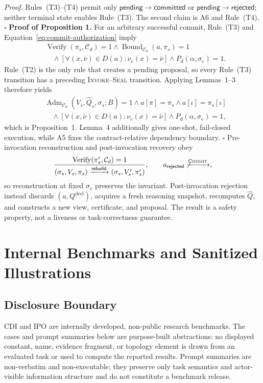 \emph{Proof.}
Rules~\textup{(T3)}--\textup{(T4)} permit only
$\mathsf{pending}\to\mathsf{committed}$ or
$\mathsf{pending}\to\mathsf{rejected}$; neither terminal state enables Rule~\textup{(T3)}. The second claim is A6 and Rule~\textup{(T4)}. \hfill$\square$
\noindent\textbf{Proof of Proposition 1.}
For an arbitrary successful commit, Rule~\textup{(T3)} and Equation~\eqref{eq:commit-authorization} imply
\begin{equation}
\begin{aligned}
&\operatorname{Verify}(\pi_s,\mathcal C_d)=1
\land\operatorname{Bound}_{\mathcal C_d}(a,\pi_s)=1\\
&\quad{}\land[\forall(x,\bar\nu)\in D(a):\nu_e(x)=\bar\nu]
\land P_d(\alpha,\sigma_e)=1.
\end{aligned}
\label{eq:prop-conjuncts}
\end{equation}
Rule~\textup{(T2)} is the only rule that creates a pending proposal, so every Rule~\textup{(T3)} transition has a preceding \textsc{Invoke--Seal} transition. Applying Lemmas~1--3 therefore yields
\begin{equation}
\begin{aligned}
&\operatorname{Adm}_{\mathcal C_d}(V_s,\widehat Q_s,\sigma_s;B)=1
\land a[\pi]=\pi_s
\land a[\iota]=\pi_s[\iota]\\
&\quad{}\land[\forall(x,\bar\nu)\in D(a):\nu_e(x)=\bar\nu]
\land P_d(\alpha,\sigma_e)=1,
\end{aligned}
\label{eq:prop-result}
\end{equation}
which is Proposition~1. Lemma~4 additionally gives one-shot, fail-closed execution, while A5 fixes the contract-relative dependency boundary. \hfill$\square$
Pre-invocation reconstruction and post-invocation recovery obey
\[
\frac{\operatorname{Verify}(\pi'_s,\mathcal C_d)=1}
{(\sigma_s,V_s,\pi_s)\xrightarrow{\mathsf{rebuild}}
(\sigma_s,V'_s,\pi'_s)},
\qquad
a_{\mathsf{rejected}}\not\xrightarrow{\textsc{Commit}},
\]
so reconstruction at fixed $\sigma_s$ preserves the invariant. Post-invocation rejection instead discards $(a,Q^{\mathrm{decl}})$, acquires a fresh reasoning snapshot, recomputes $\widehat Q$, and constructs a new view, certificate, and proposal. The result is a safety property, not a liveness or task-correctness guarantee.
\section{Internal Benchmarks and Sanitized Illustrations}
\label{app:benchmark-illustrations}
\subsection{Disclosure Boundary}
CDI and IPO are internally developed, non-public research benchmarks. The cases and prompt summaries below are purpose-built abstractions: no displayed constant, name, evidence fragment, or topology element is drawn from an evaluated task or used to compute the reported results. Prompt summaries are non-verbatim and non-executable; they preserve only task semantics and actor-visible information structure and do not constitute a benchmark release.
